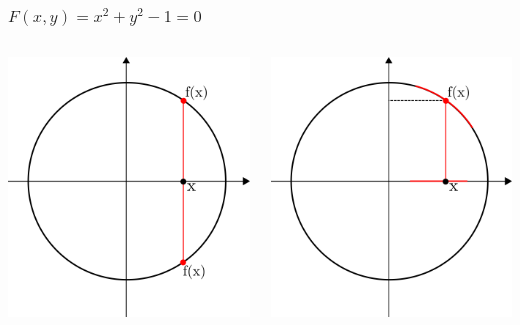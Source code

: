 \documentclass[spanish]{beamer}
\begin{document}
\begin{frame}
    \frametitle{$F(x,y)=x^{2}+y^{2}-1=0$}
    \begin{columns}
        \begin{center}
            \includegraphics[scale=0.3]{../gfx/unit-circle1}
        \end{center}
        \begin{center}
            \includegraphics[scale=0.3]{../gfx/unit-circle2}
        \end{center}
    \end{columns}
\end{frame}
\end{document}
